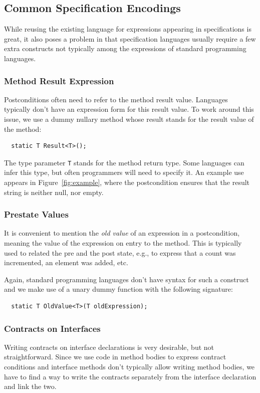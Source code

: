 \documentclass{sig-alternate}
\newcommand{\code}[1]{\lstinline{#1}}
\begin{document}
\subsection{Common Specification Encodings}
\noindent
While reusing the existing language for expressions appearing in
specifications is great, it also poses a problem in that specification
languages usually require a few extra constructs not typically among
the expressions of standard programming languages.

\subsubsection{Method Result Expression} 
\noindent
Postconditions often need to refer to the method result
value. Languages typically don't have an expression form for this
result value. To work around this issue, we use a dummy nullary method
whose result stands for the result value of the method:
\begin{lstlisting}
  static T Result<T>();
\end{lstlisting}
The type parameter \code{T} stands for the method return type. Some
languages can infer this type, but often programmers will need to
specify it.
An example use appears in Figure~\ref{fig:example}, where the
postcondition ensures that the result string is neither null, nor empty.

\subsubsection{Prestate Values}
\noindent
It is convenient to mention the \emph{old value} of an expression in a
postcondition, meaning the value of the expression on entry to the
method. This is typically used to related the pre and the post state,
e.g., to express that a count was incremented, an element was added,
etc.

Again, standard programming languages don't have syntax for such a
construct and we make use of a unary dummy function with the following signature:
\begin{lstlisting}
  static T OldValue<T>(T oldExpression);
\end{lstlisting}

\subsubsection{Contracts on Interfaces}
\noindent
Writing contracts on interface declarations is very desirable, but not
straightforward. Since we use code in method bodies to express contract
conditions and interface methods don't typically allow writing method
bodies, we have to find a way to write the contracts separately from
the interface declaration and link the two. 
\end{document}
